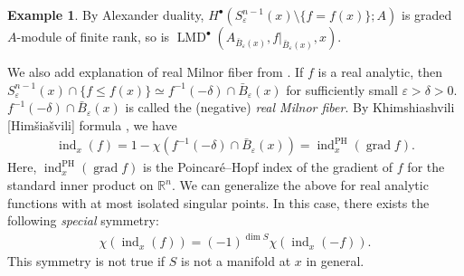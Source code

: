 \documentclass[a4paper,dvipdfmx,reqno,12pt]{amsart}
\theoremstyle{definition}
\newtheorem{example}[theorem]{Example}
\newcommand{\vep}{\varepsilon}%
\newcommand{\opn}[1]{\operatorname{#1}}
\numberwithin{equation}{section}
\begin{document}
\begin{example}
By Alexander duality, 
$H^{\bullet}(S_{\varepsilon}^{n-1}(x)\setminus \{f=f(x)\};A)$ 
is graded $A$-module of finite rank, so 
is $\opn{LMD}^{\bullet}(A_{\bar{B}_{\varepsilon}(x)},
f|_{\bar{B}_{\varepsilon}(x)},x)$.

We also add explanation of real Milnor fiber from
\cite[3.2]{MR3779558}.
If $f$ is a real analytic, then 
$S_{\varepsilon}^{n-1}(x)\cap \{f\leq f(x)\}\simeq 
f^{-1}(-\delta)\cap \bar{B}_{\varepsilon}(x)$
for sufficiently small $\vep>\delta>0$.
$f^{-1}(-\delta)\cap \bar{B}_{\varepsilon}(x)$ is called 
the (negative) \emph{real Milnor fiber}.
By Khimshiashvili [Him\v{s}ia\v{s}vili] formula \cite{MR0458467}, we have
\begin{align} \label{equation-Khimshiashvili}
  \opn{ind}_x(f)
=1-\chi(f^{-1}(-\delta)\cap \bar{B}_{\varepsilon}(x))
=\opn{ind}^{\opn{PH}}_{x}(\opn{grad} f).
\end{align}
Here, $\opn{ind}^{\opn{PH}}_x(\opn{grad} f)$ is the 
Poincar\'e--Hopf index of the gradient of $f$ for the standard 
inner product on ${\mathbb{R}}^{n}$.
We can generalize the above for real analytic functions with 
at most isolated singular points. 
In this case, there exists the following \emph{special} symmetry:
\begin{align}
\chi(\opn{ind}_x(f))=
(-1)^{\dim S}\chi(\opn{ind}_x(-f)).
\end{align}
This symmetry is not true if $S$ is not a manifold at $x$
in general. 

\end{example}
\end{document}
